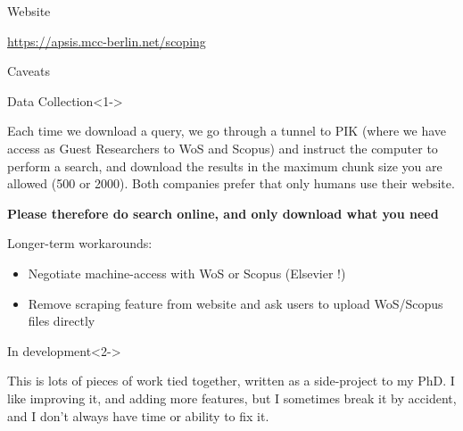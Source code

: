\documentclass[9pt]{beamer}
\begin{document}

\begin{frame}{Website}

\url{https://apsis.mcc-berlin.net/scoping}

\end{frame}





\begin{frame}{Caveats}

\begin{block}{Data Collection}<1->

Each time we download a query, we go through a tunnel to PIK (where we have access as Guest Researchers to WoS and Scopus) and instruct the computer to perform a search, and download the results in the maximum chunk size you are allowed (500 or 2000). Both companies prefer that only humans use their website.

\medskip

\textbf{Please therefore do search online, and only download what you need}
\medskip

Longer-term workarounds:
\begin{itemize}
	\item Negotiate machine-access with WoS or Scopus (Elsevier !)
	\item Remove scraping feature from website and ask users to upload WoS/Scopus files directly
\end{itemize}

\end{block}

\begin{block}{In development}<2->
	
	This is lots of pieces of work tied together, written as a side-project to my PhD. I like improving it, and adding more features, but I sometimes break it by accident, and I don't always have time or ability to fix it.
	
\end{block}


\end{frame}

\end{document}
